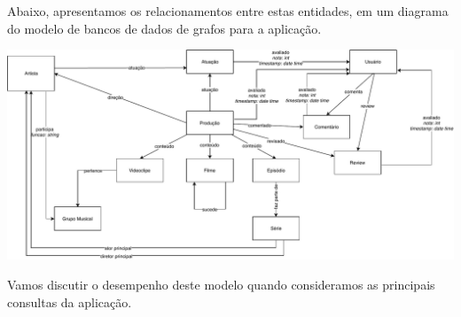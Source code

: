 \documentclass[12pt]{article}
\begin{document}
Abaixo, apresentamos os relacionamentos entre estas entidades, em um 
diagrama do modelo de bancos de dados de grafos para a aplicação.

\begin{center}
\includegraphics[width=\linewidth]{Diagrama_bdgrafos1.pdf}
\end{center}

Vamos discutir o desempenho deste modelo quando consideramos as
principais consultas da aplicação.
\end{document}

